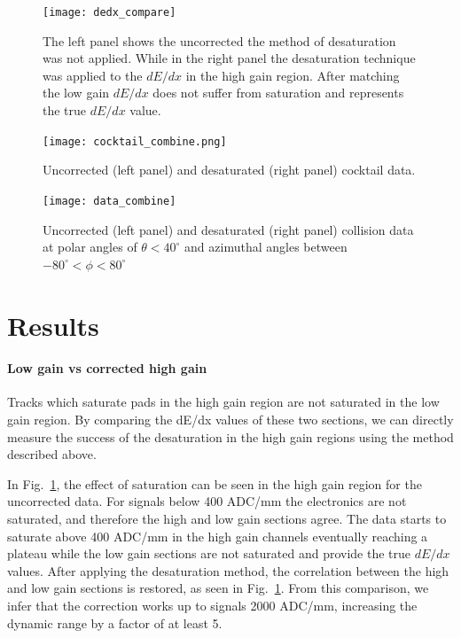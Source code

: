 \documentclass[review]{elsarticle}
\begin{document}
\begin{figure}[t]
\centering
\texttt{[image: dedx\_compare]}
\caption{The left panel shows the uncorrected the method of desaturation was not applied. While in the right panel the desaturation technique was applied to the $dE/dx$ in the high gain region. After matching the low gain $dE/dx$ does not suffer from saturation and represents the true $dE/dx$ value.}
\label{fig:lowvshigh}
\end{figure}

\begin{figure}[t]
\texttt{[image: cocktail\_combine.png]}
\caption{Uncorrected (left panel) and desaturated (right panel) cocktail data.}
\label{fig:cocktail_combine}
\end{figure}

\begin{figure}[t]
\texttt{[image: data\_combine]}
\caption{Uncorrected (left panel) and desaturated (right panel) collision data at polar angles of $\theta < 40^{\circ}$ and azimuthal angles between $-80^{\circ} < \phi < 80^{\circ}$}
\label{fig:data_combine}
\end{figure}

\section{Results}
\paragraph{Low gain vs corrected high gain}

Tracks which saturate pads in the high gain region are not saturated in the low gain region. By comparing the dE/dx values of these two sections, we can directly measure the success of the desaturation in the high gain regions using the method described above.  
 
In Fig.~\ref{fig:lowvshigh}, the effect of saturation can be seen in the high gain region for the uncorrected data. For signals below 400 ADC/mm the electronics are not saturated, and therefore the high and low gain sections agree. The data starts to saturate above 400 ADC/mm in the high gain channels eventually reaching a plateau while the low gain sections are not saturated and provide the true $dE/dx$ values.
 After applying the desaturation method, the correlation between the high and low gain sections is restored, as seen in Fig.~\ref{fig:lowvshigh}. From this comparison, we infer that the correction works up to signals 2000 ADC/mm, increasing the dynamic range by a factor of at least 5.
\end{document}
